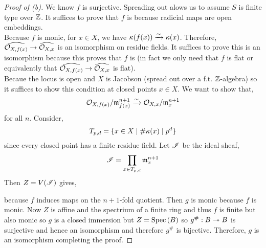\documentclass[12pt]{article}
\begin{document}
\begin{proof}[Proof of (b)]
We know $f$ is surjective. Spreading out alows us to assume $S$ is finite type over $\mathbb{Z}$. It suffices to prove that $f$ is \etale because \etale radicial maps are open embeddings.
\bigskip\\
Because $f$ is monic, for $x \in X$, we have $\kappa(f(x)) \xrightarrow{\sim} \kappa(x)$. Therefore, $\widehat{\mathcal{O}_{X, f(x)}} \to \widehat{\mathcal{O}_{X, x}}$ is an isomorphism on residue fields. It suffices to prove this is an isomorphism because this proves that $f$ is \etale (in fact we only need that $f$ is flat or equivalently that $\widehat{\mathcal{O}_{X, f(x)}} \to \widehat{\mathcal{O}_{X, x}}$ is flat). 
\bigskip\\
Becaue the \etale locus is open and $X$ is Jacobson (spread out over a f.t. $\mathbb{Z}$-algebra) so it suffices to show this condition at closed points $x \in X$. We want to show that,
\[ \mathcal{O}_{X, f(x)} / \mathfrak{m}_{f(x)}^{n+1} \xrightarrow{\sim} \mathcal{O}_{X, x} / \mathfrak{m}_x^{n+1} \]
for all $n$. Consider,
\[ T_{p,d} = \{ x \in X \mid \# \kappa(x) \mid p^d \} \]
since every closed point has a finite residue field. Let $\mathscr{I}$ be the ideal sheaf,
\[ \mathscr{I} = \prod_{x \in T_{p,d}} \mathfrak{m}_x^{n+1} \]
Then $Z = V(\mathscr{I})$ gives,
\begin{center}
\end{center}
because $f$ induces maps on the $n+1$-fold quotient. Then $g$ is monic because $f$ is monic. Now $Z$ is affine and the spectrium of a finite ring and thus $f$ is finite but also monic so $g$ is a closed immersion but $Z = \mathrm{Spec}\left( B \right)$ so $g^\# : B \twoheadrightarrow B$ is surjective and hence an isomorphism and therefore $g^\#$ is bijective. Therefore, $g$ is an isomorphism completing the proof. 
\end{proof}
\end{document}
